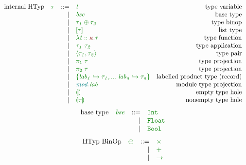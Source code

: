 \documentclass[12pt,fleqn]{article}
\newcommand{\red}[1]{\textcolor{red}{#1}}
\newcommand{\green}[1]{\textcolor{green}{#1}}
\newcommand{\teal}[1]{\textcolor{teal}{#1}}
\newcommand{\greentt}[1]{\green{\mathtt{#1}}}
\newcommand{\redit}[1]{\red{\mathit{#1}}}
\newcommand{\greenit}[1]{\green{\mathit{#1}}}
\newcommand{\tealit}[1]{\teal{\mathit{#1}}}
\newcommand{\knd}[1][]{\redit{\kappa#1}}
\newcommand{\typ}[1][]{\greenit{\tau#1}}
\newcommand{\typvar}[1][]{\greenit{t#1}}
\renewcommand{\mod}[1][]{\tealit{mod#1}}
\newcommand{\lab}[1][]{\mathit{lab#1}}
\newcommand{\TypCFun}[2]{\greentt{\lambda #1.#2}}
\newcommand{\TypCAp}[2]{\greentt{#1~#2}}
\newcommand{\TypCPair}[2]{\greentt{\langle #1, #2\rangle}}
\newcommand{\TypCPairPrjL}[1]{\greentt{\pi_1~#1}}
\newcommand{\TypCPairPrjR}[1]{\greentt{\pi_2~#1}}
\newcommand{\ListTyp}[1]{\greentt{[#1]}}
\newcommand{\TypCHole}[1][]{\greentt{\llparenthesis #1 \rrparenthesis}}
\newcommand{\Int}{\greentt{Int}}
\newcommand{\Float}{\greentt{Float}}
\newcommand{\Bool}{\greentt{Bool}}
\begin{document}
\[\begin{array}{rcrlr}
    \textrm{internal HTyp} & \typ & ::=
                           & \typvar & \textrm{type variable} \\
                           && \vert & \greenit{bse} & \textrm{base type} \\
                           && \vert & \greentt{\typ[_1] \oplus \typ[_2]} & \textrm{type binop} \\
                           && \vert & \ListTyp{\typ} & \textrm{list type} \\
                           && \vert & \TypCFun{\typvar::\knd}{\typ} & \textrm{type function} \\
                           && \vert & \TypCAp{\typ[_1]}{\typ[_2]} & \textrm{type application} \\
                           && \vert & \TypCPair{\typ[_1]}{\typ[_2]} & \textrm{type pair} \\
                           && \vert & \TypCPairPrjL{\typ} & \textrm{type projection} \\
                           && \vert & \TypCPairPrjR{\typ} & \textrm{type projection} \\
                           && \vert & \greentt{\{\lab[_1] \hookrightarrow \typ[_1], ...~\lab[_n] \hookrightarrow \typ[_n]\}} & \textrm{labelled product type (record)} \\
                           && \vert & \greentt{\mod.\lab} & \textrm{module type projection} \\
                           && \vert & \TypCHole & \textrm{empty type hole} \\
                           && \vert & \TypCHole[\typ] & \textrm{nonempty type hole} \\
\end{array}\]
\[\begin{array}{rcrlr}
    \textrm{base type} & \greenit{bse} & ::=
                       & \Int \\
                       && \vert & \Float \\
                       && \vert & \Bool \\
\end{array}\]
\[\begin{array}{rcrlr}
    \textrm{HTyp BinOp} & \greenit{\oplus} & ::=
                   & \greentt{\times} \\
                   && \vert & \greentt{+} \\
                   && \vert & \greentt{\rightarrow}\\
\end{array}\]
\end{document}
